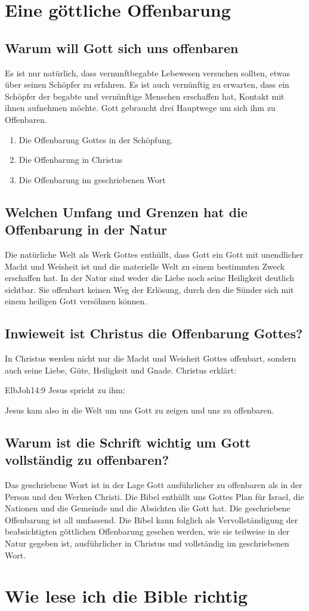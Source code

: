 \section{Eine göttliche Offenbarung}
\subsection{Warum will Gott sich uns offenbaren}
Es ist nur natürlich, dass vernunftbegabte Lebewesen versuchen sollten, etwas über seinen Schöpfer zu erfahren. Es ist auch vernünftig zu erwarten, dass ein Schöpfer der begabte und vernünftige Menschen erschaffen hat, Kontakt mit ihnen aufnehmen möchte. Gott gebraucht drei Hauptwege um sich ihm zu Offenbaren.
\begin{enumerate}
	\item Die Offenbarung Gottes in der Schöpfung.
	\item Die Offenbarung in Christus
	\item Die Offenbarung im geschriebenen Wort
\end{enumerate}
\subsection{Welchen Umfang und Grenzen hat die Offenbarung in der Natur}
Die natürliche Welt als Werk Gottes enthüllt, dass Gott ein Gott mit unendlicher Macht und Weisheit ist und die materielle Welt zu einem bestimmten Zweck erschaffen hat. In der Natur sind weder die Liebe noch seine Heiligkeit deutlich sichtbar. Sie offenbart keinen Weg der Erlösung, durch den die Sünder sich mit einem heiligen Gott versöhnen können.
\subsection{Inwieweit ist Christus die Offenbarung Gottes?}
In Christus werden nicht nur die Macht und Weisheit Gottes offenbart, sondern auch seine Liebe, Güte, Heiligkeit und Gnade. Christus erklärt:
\begin{bibeltext}{Elb}{Joh}{14:9}
	Jesus spricht zu ihm: 
\end{bibeltext} 
Jesus kam also in die Welt um uns Gott zu zeigen und uns zu offenbaren.
\subsection{Warum ist die Schrift wichtig um Gott vollständig zu offenbaren?}
Das geschriebene Wort ist in der Lage Gott ausführlicher zu offenbaren als in der Person und den Werken Christi. Die Bibel enthüllt uns Gottes Plan für Israel, die Nationen und die Gemeinde und die Absichten die Gott hat. Die geschriebene Offenbarung ist all umfassend. Die Bibel kann folglich als Vervollständigung der beabsichtigten göttlichen Offenbarung gesehen werden, wie sie teilweise in der Natur gegeben ist, ausführlicher in Christus und vollständig im geschriebenen Wort. 
\section{Wie lese ich die Bible richtig}
\begin{displayquote}
\end{displayquote}


